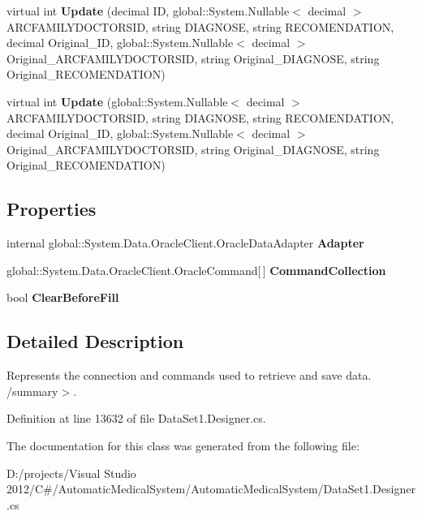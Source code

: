 \begin{CompactItemize}
\item 
virtual int \textbf{Update} (decimal ID, global::System.Nullable$<$ decimal $>$ ARCFAMILYDOCTORSID, string DIAGNOSE, string RECOMENDATION, decimal Original\_\-ID, global::System.Nullable$<$ decimal $>$ Original\_\-ARCFAMILYDOCTORSID, string Original\_\-DIAGNOSE, string Original\_\-RECOMENDATION)\label{class_automatic_medical_system_1_1_data_set1_table_adapters_1_1_d_i_a_g_n_o_s_e___f_m___d_o_c_t_o_r_table_adapter_7c48050fdfe6f11d5665bc4bd49207cd}

\item 
virtual int \textbf{Update} (global::System.Nullable$<$ decimal $>$ ARCFAMILYDOCTORSID, string DIAGNOSE, string RECOMENDATION, decimal Original\_\-ID, global::System.Nullable$<$ decimal $>$ Original\_\-ARCFAMILYDOCTORSID, string Original\_\-DIAGNOSE, string Original\_\-RECOMENDATION)\label{class_automatic_medical_system_1_1_data_set1_table_adapters_1_1_d_i_a_g_n_o_s_e___f_m___d_o_c_t_o_r_table_adapter_83e6fe99e23c42a899b4667120f1024f}

\end{CompactItemize}
\subsection*{Properties}
\begin{CompactItemize}
\item 
internal global::System.Data.OracleClient.OracleDataAdapter \textbf{Adapter}\hspace{0.3cm}{\tt  [get]}\label{class_automatic_medical_system_1_1_data_set1_table_adapters_1_1_d_i_a_g_n_o_s_e___f_m___d_o_c_t_o_r_table_adapter_046d59b3cc555a1552df3cea3cb256d0}

\item 
global::System.Data.OracleClient.OracleCommand[$\,$] \textbf{CommandCollection}\hspace{0.3cm}{\tt  [get]}\label{class_automatic_medical_system_1_1_data_set1_table_adapters_1_1_d_i_a_g_n_o_s_e___f_m___d_o_c_t_o_r_table_adapter_91cb10c5354a97cd5a4d4ff2dab8fabf}

\item 
bool \textbf{ClearBeforeFill}\hspace{0.3cm}{\tt  [get, set]}\label{class_automatic_medical_system_1_1_data_set1_table_adapters_1_1_d_i_a_g_n_o_s_e___f_m___d_o_c_t_o_r_table_adapter_e32c4e8e833ea51f7b9dc01084d24730}

\end{CompactItemize}


\subsection{Detailed Description}
Represents the connection and commands used to retrieve and save data. /summary$>$. 

Definition at line 13632 of file DataSet1.Designer.cs.

The documentation for this class was generated from the following file:\begin{CompactItemize}
\item 
D:/projects/Visual Studio 2012/C\#/AutomaticMedicalSystem/AutomaticMedicalSystem/DataSet1.Designer.cs\end{CompactItemize}
